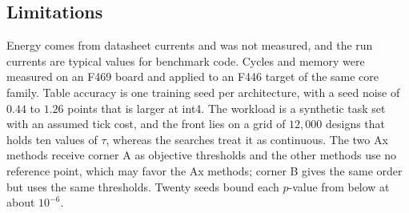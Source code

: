\subsection{Limitations}
\label{sec:limitations}
Energy comes from datasheet currents and was not measured, and the run
currents are typical values for benchmark code. Cycles and memory were
measured on an F469 board and applied to an F446 target of the same core family.
Table accuracy is one training seed per architecture, with a seed noise of
$0.44$ to $1.26$ points that is larger at int4. The workload is a
synthetic task set with an assumed tick cost, and the front lies on a grid
of $12{,}000$ designs that holds ten values of $\tau$, whereas the searches
treat it as continuous. The two Ax methods receive corner A as objective thresholds and the other
methods use no reference point, which may favor the Ax methods; corner B
gives the same order but uses the same thresholds. Twenty seeds bound each
$p$-value from below at about $10^{-6}$.
